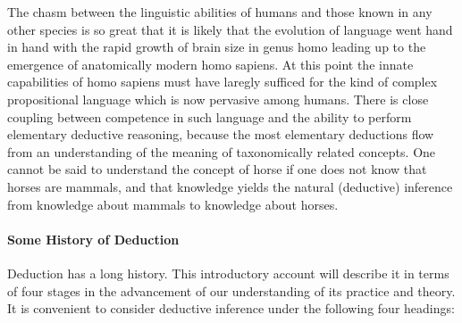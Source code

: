 \documentclass[10pt,titlepage]{book}
\begin{document}
{The chasm between the linguistic abilities of humans and those known in any other species is so great that it is likely that the evolution of language went hand in hand with the rapid growth of brain size in genus homo leading up to the emergence of anatomically modern homo sapiens.
At this point the innate capabilities of homo sapiens must have laregly sufficed for the kind of complex propositional language which is now pervasive among humans.
There is close coupling between competence in such language and the ability to perform elementary deductive reasoning, because the most elementary deductions flow from an understanding of the meaning of taxonomically related concepts.
One cannot be said to understand the concept of horse if one does not know that horses are mammals, and that knowledge yields the natural (deductive) inference from knowledge about mammals to knowledge about horses.

}

\paragraph{Some History of Deduction}

Deduction has a long history.
This introductory account will describe it in terms of four stages in the advancement of our understanding of its practice and theory.
It is convenient to consider deductive inference under the following four headings:
\end{document}
